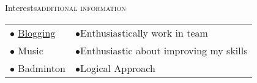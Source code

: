 \documentclass[letterpaper,10pt]{article}
\newcommand{\shortersection}[2]{\vspace{11pt}\scshape\raggedright\large{\color{black}\titlerule \vspace{-10pt}#1}\hfill\scshape\large{#2}}
\begin{document}

\shortersection{Interests}{additional information}

\vspace{6pt}
\begin{tabular}{p{13cm} p}
\small
$\bullet$ \color{blue}\href{https://medium.com/@sanchittanwar75}{Blogging} & 
\small
$\bullet$\hspace{2pt}Enthusiastically work in team\hfill \\
\small
$\bullet$ Music & 
\small
$\bullet$\hspace{2pt}Enthusiastic about improving my skills\hfill \\
\small
$\bullet$ Badminton & 
\small
 $\bullet$\hspace{2pt}Logical Approach\hfill
\end{tabular}
\end{document}
